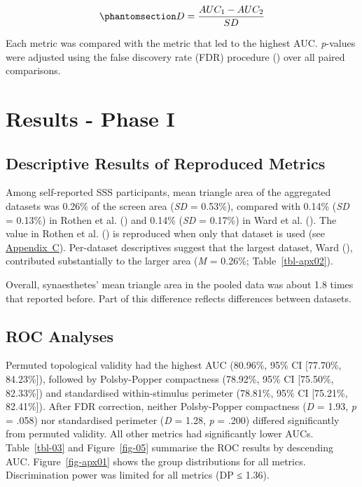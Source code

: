 \documentclass[
  man,
  floatsintext,
  longtable,
  nolmodern,
  notxfonts,
  notimes,
  colorlinks=true,linkcolor=blue,citecolor=blue,urlcolor=blue]{apa7}
\begin{document}
\begin{equation}\protect\phantomsection\label{eq-D}{D = \frac{AUC_1-AUC_2}{SD}}\end{equation}

Each metric was compared with the metric that led to the highest AUC.
\emph{p}-values were adjusted using the false discovery rate (FDR)
procedure ()
over all paired comparisons.

\section{Results - Phase I}\label{sec-results}

\subsection{Descriptive Results of Reproduced
Metrics}\label{descriptive-results-of-reproduced-metrics}

Among self-reported SSS participants, mean triangle area of the
aggregated datasets was 0.26\% of the screen area (\emph{SD} = 0.53\%),
compared with 0.14\% (\emph{SD} = 0.13\%) in Rothen et al.
() and 0.14\% (\emph{SD} = 0.17\%) in
Ward et al. (). The value in Rothen et al.
() is reproduced when only that dataset
is used (see \hyperref[apx-SM2byds]{Appendix~C}). Per-dataset
descriptives suggest that the largest dataset, Ward
(), contributed substantially to the
larger area (\emph{M} = 0.26\%; Table~\ref{tbl-apx02}).

Overall, synaesthetes' mean triangle area in the pooled data was about
1.8 times that reported before. Part of this difference reflects
differences between datasets.

\subsection{ROC Analyses}\label{roc-analyses}

Permuted topological validity had the highest AUC (80.96\%, 95\% CI
{[}77.70\%, 84.23\%{]}), followed by Polsby-Popper compactness (78.92\%,
95\% CI {[}75.50\%, 82.33\%{]}) and standardised within-stimulus
perimeter (78.81\%, 95\% CI {[}75.21\%, 82.41\%{]}). After FDR
correction, neither Polsby-Popper compactness (\emph{D} = 1.93, \emph{p}
= .058) nor standardised perimeter (\emph{D} = 1.28, \emph{p} = .200)
differed significantly from permuted validity. All other metrics had
significantly lower AUCs. Table~\ref{tbl-03} and Figure~\ref{fig-05}
summarise the ROC results by descending AUC. Figure~\ref{fig-apx01}
shows the group distributions for all metrics. Discrimination power was
limited for all metrics (DP ≤ 1.36).
\end{document}
